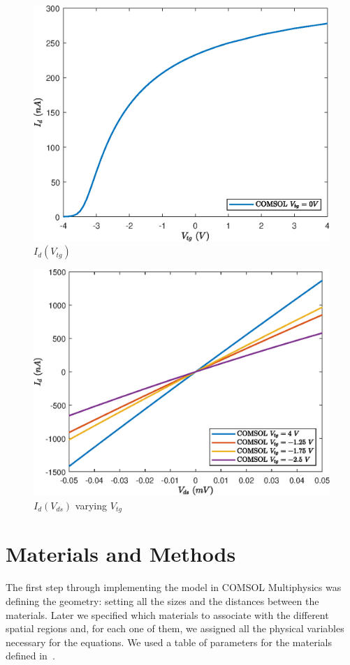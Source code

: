 \documentclass[electronics,article,submit,moreauthors,pdftex]{Definitions/mdpi}
\begin{document}
\begin{figure}[H]
	\centering
	\includegraphics[width=.8\textwidth]{Grafici/HfZrO2_Id(Vtg).eps} 
	\caption{$I_d(V_{tg})$}
	\label{fig:HfZrO2_Id(Vtg)}
\end{figure} 

\begin{figure}[H]
	\centering
	\includegraphics[width=.8\textwidth]{Grafici/HfZrO2_Id(Vds)_varying_Vtg.eps} 
	\caption{$I_d(V_{ds})$ varying $V_{tg}$}
	\label{fig:HfZrO2_Id(Vds)_varying_Vtg}
\end{figure}


\section{Materials and Methods}

The first step through implementing the model in COMSOL Multiphysics was defining the geometry: setting all the sizes and the distances between the materials. Later we specified which materials to associate with the different spatial regions and, for each one of them, we assigned all the physical variables necessary for the equations. We used a table of parameters for the materials defined in~\cite{Howell:MonolayerMultiLayer_MoS2}.
\end{document}
